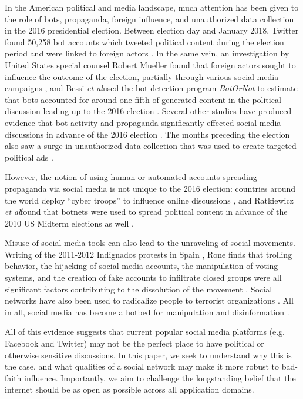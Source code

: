\documentclass[sigconf,authordraft]{acmart}
\newcommand{\etal}{{\itshape et al}}
\begin{document}
In the American political and media landscape, much attention has been given to the role of bots, propaganda, foreign influence, and unauthorized data collection in the 2016 presidential election. Between election day and January 2018, Twitter found 50,258 bot accounts which tweeted political content during the election period and were linked to foreign actors \cite{Twitter2016BotReport}. In the same vein, an investigation by United States special counsel Robert Mueller found that foreign actors sought to influence the outcome of the election, partially through various social media campaigns \cite{mueller2019report}, and Bessi \etal used the bot-detection program {\itshape BotOrNot} \cite{davis2016botornot} to estimate that bots accounted for around one fifth of generated content in the political discussion leading up to the 2016 election \cite{bessi2016social}. Several other studies have  produced evidence that bot activity and propaganda significantly effected social media discussions in advance of the 2016 election \cite{howard2017junk, badawy2018analyzing, woolley2017computational, shao2018spread}. The months preceding the election also saw a surge in unauthorized data collection that was used to create targeted political ads \cite{CambridgeAnalyticaNYT}.

However, the notion of using human or automated accounts spreading propaganda via social media is not unique to the 2016 election: countries around the world deploy ``cyber troops'' to influence online discussions \cite{bradshaw2017troops}, and Ratkiewicz \etal found that botnets were used to spread political content in advance of the 2010 US Midterm elections as well \cite{ratkiewicz2011truthy}.

Misuse of social media tools can also lead to the unraveling of social movements. Writing of the 2011-2012 Indignados protests in Spain \cite{indignadosBBC}, Rone finds that trolling behavior, the hijacking of social media accounts, the manipulation of voting systems, and the creation of fake accounts to infiltrate closed groups were all significant factors contributing to the dissolution of the movement \cite{rone2019fake}. Social networks have also been used to radicalize people to terrorist organizations \cite{o2007virtual,Torok2016SocialMA}. All in all, social media has become a hotbed for manipulation and disinformation \cite{benkler2018network}.

All of this evidence suggests that current popular social media platforms (e.g. Facebook and Twitter) may not be the perfect place to have political or otherwise sensitive discussions. In this paper, we seek to understand why this is the case, and what qualities of a social network may make it more robust to bad-faith influence. Importantly, we aim to challenge the longstanding belief that the internet should be as open as possible across all application domains. 
\end{document}
